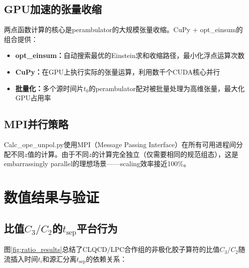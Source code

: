 \documentclass[12pt,a4paper]{ctexart}
\theoremstyle{definition}
\begin{document}
\subsection{GPU加速的张量收缩}

两点函数计算的核心是perambulator的大规模张量收缩\cite{代码解析}。CuPy + opt\_einsum的组合提供：
\begin{itemize}
    \item \textbf{opt\_einsum：}自动搜索最优的Einstein求和收缩路径，最小化浮点运算次数
    \item \textbf{CuPy：}在GPU上执行实际的张量运算，利用数千个CUDA核心并行
    \item \textbf{批量化：}多个源时间片$t_0$的perambulator配对被批量处理为高维张量，最大化GPU占用率
\end{itemize}

\subsection{MPI并行策略}

Calc\_ope\_unpol.py使用MPI（Message Passing Interface）在所有可用进程间分配不同$z$值的计算\cite{代码解析}。由于不同$z$的计算完全独立（仅需要相同的规范组态），这是embarrassingly parallel的理想场景——scaling效率接近100\%。

\section{数值结果与验证}

\subsection{比值$C_3/C_2$的$t_{\text{sep}}$平台行为}

图\ref{fig:ratio_results}总结了CLQCD/LPC合作组\cite{NoteGluonPDFs}的非极化胶子算符的比值$C_3/C_2$随流插入时间$t_i$和源汇分离$t_{\text{sep}}$的依赖关系：
\end{document}

